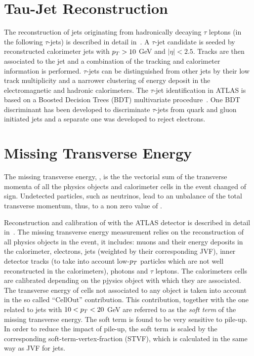 \section{Tau-Jet Reconstruction}\label{sec:tau}
The reconstruction of jets originating from hadronically decaying $\tau$ leptons (in the following $\tau$-jets)
is described in detail in~\cite{AtlasCSCBook}.
A $\tau$-jet candidate is seeded by reconstructed calorimeter jets with $p_{T} > 10$ GeV and $|\eta| < 2.5$.
Tracks are then associated to the jet and a combination of the tracking and calorimeter information
is performed.  $\tau$-jets    can be distinguished from other 
jets by their low track multiplicity and a narrower clustering of energy deposit in the electromagnetic and hadronic calorimeters.
 The $\tau$-jet identification in ATLAS is based on a Boosted Decision Trees (BDT) multivariate procedure~\cite{ATLASTAUIDnew}.
One BDT discriminant has been developed to discriminate $\tau$-jets  from quark and gluon 
initiated jets and a separate one was developed to reject electrons.


\section{Missing Transverse Energy } \label{sec:met}
The missing transverse energy, \met, is the the vectorial sum of the transverse momenta
of all the physics objects and calorimeter cells in the event changed of sign. 
Undetected particles, such as neutrinos, lead to an unbalance of the total
transverse momentum, thus, to a non zero value of \met.

Reconstruction and calibration of \met with the  ATLAS detector is described in detail in~\cite{ETMISS}. 
The missing transverse energy measurement relies on the reconstruction of all physics objects 
in the event, it includes: muons and their energy deposits in the calorimeter, electrons, jets (weighted by their corresponding JVF), 
inner detector tracks (to take into account low-$p_{T}$ particles which are not well reconstructed in the calorimeters),
photons and $\tau$ leptons. The calorimeters cells are calibrated depending on the
pjysics object with which they are associated. The transverse energy of cells not associated to any object is taken into account in 
the so called ``CellOut'' contribution. This contribution,  together with the one related to jets with $10 < p_{T} < 20$ GeV
are referred to as the \emph{soft term} of the missing transverse energy.
The soft term is found to be very sensitive to pile-up. In order to reduce the impact of pile-up, the soft term
is scaled  by  the corresponding soft-term-vertex-fraction (STVF), which is calculated in the same way as JVF for jets.

